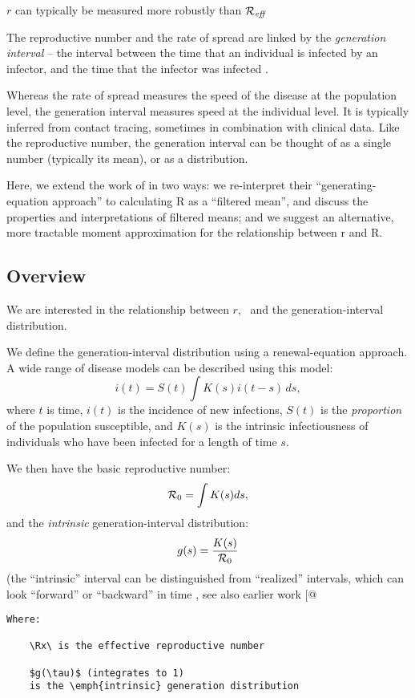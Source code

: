 \(r\) can typically be measured more robustly than \({\cal R}_{\mathit{eff}}\)

The reproductive number and the rate of spread are linked by the
\emph{generation interval} -- the interval between the time that an
individual is infected by an infector, and the time that the infector
was infected \cite{Sven07}.

Whereas the rate of spread measures the speed of the disease at the
population level, the generation interval measures speed at the
individual level. It is typically inferred from contact tracing,
sometimes in combination with clinical data. Like the reproductive
number, the generation interval can be thought of as a single number
(typically its mean), or as a distribution.

Here, we extend the work of \autocite{WallLips07} in two ways: we
re-interpret their ``generating-equation approach'' to calculating R as
a ``filtered mean'', and discuss the properties and interpretations of
filtered means; and we suggest an alternative, more tractable moment
approximation for the relationship between r and R.

\subsection{Overview}\label{overview}

We are interested in the relationship between \(r\), \Rx~and the
generation-interval distribution.

We define the generation-interval distribution using a renewal-equation
approach. A wide range of disease models can be described using this
model: \[i(t) = S(t)\int{K(s)i(t-s) \,ds},\] where \(t\) is time,
\(i(t)\) is the incidence of new infections, \(S(t)\) is the
\emph{proportion} of the population susceptible, and \(K(s)\) is the
intrinsic infectiousness of individuals who have been infected for a
length of time \(s\).

We then have the basic reproductive number: \[{\cal R}_{0} = \int{K(s)ds},\] and
the \emph{intrinsic} generation-interval distribution:
\[g(s) = \frac{K(s)}{{\cal R}_{0}}\] (the ``intrinsic'' interval can be
distinguished from ``realized'' intervals, which can look ``forward'' or
``backward'' in time \autocite{ChamDush15}, see also earlier work {[}@

\begin{verbatim}
Where:

    \Rx\ is the effective reproductive number

    $g(\tau)$ (integrates to 1)  
    is the \emph{intrinsic} generation distribution
\end{verbatim}

